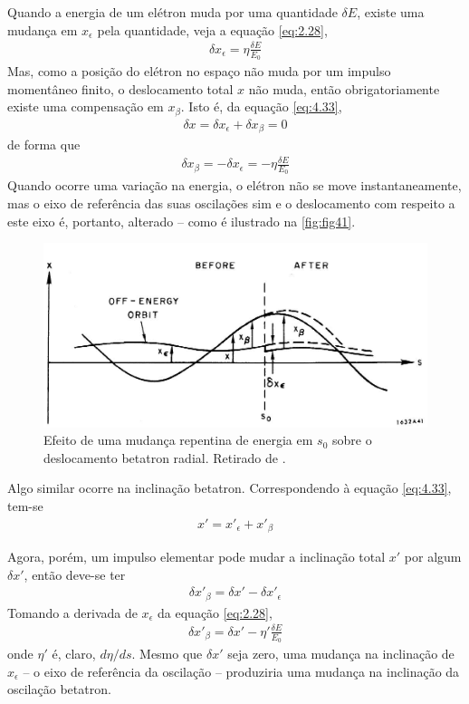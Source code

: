 Quando a energia de um elétron muda por uma quantidade $\delta E$, existe uma mudança em $x_\epsilon$ pela quantidade, veja a equação \eqref{eq:2.28},
\begin{align}
	\delta x_\epsilon = \eta \frac{\delta E}{E_0}
\end{align}
Mas, como a posição do elétron no espaço não muda por um impulso momentâneo finito, o deslocamento total $x$ não muda, então obrigatoriamente existe uma compensação em $x_\beta$. Isto é, da equação \eqref{eq:4.33},
\begin{align*}
	\delta x = \delta x_\epsilon + \delta x_\beta = 0
\end{align*}
de forma que
\begin{align}
	\delta x_\beta = -\delta x_\epsilon = -\eta \frac{\delta E}{E_0}\label{eq:4.35}
\end{align}
Quando ocorre uma variação na energia, o elétron não se move instantaneamente, mas o eixo de referência das suas oscilações sim e o deslocamento com respeito a este eixo é, portanto, alterado --  como é ilustrado na \autoref{fig:fig41}.

\begin{figure}[!htb]
	\centering
	\includegraphics[width=0.9\linewidth]{./Figuras/fig41.jpeg}
	\caption{Efeito de uma mudança repentina de energia em $s_0$ sobre o deslocamento betatron radial. Retirado de \cite{sands1970physics}.}
	\label{fig:fig41}
\end{figure}

Algo similar ocorre na inclinação betatron. Correspondendo à equação \eqref{eq:4.33}, tem-se
\begin{align}
	x' = x'_\epsilon + x'_\beta
\end{align}

Agora, porém, um impulso elementar pode mudar a inclinação total $x'$ por algum $\delta x'$, então deve-se ter
\begin{align}
	\delta x'_\beta = \delta x' - \delta x'_\epsilon
\end{align}
Tomando a derivada de $x_\epsilon$ da equação \eqref{eq:2.28},
\begin{align}
	\delta x'_\beta = \delta x' - \eta' \frac{\delta E}{E_0}\label{eq:4.38}
\end{align}
onde $\eta'$ é, claro, $d\eta/ds$. Mesmo que $\delta x'$ seja zero, uma mudança na inclinação de $x_\epsilon$ -- o eixo de referência da oscilação -- produziria uma mudança na inclinação da oscilação betatron.

